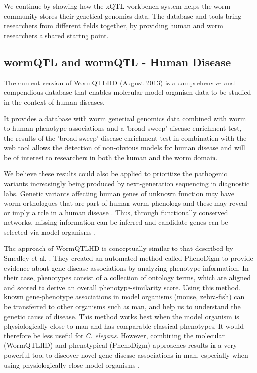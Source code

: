 We continue by showing how the xQTL workbench system helps the worm community stores their genetical 
genomics data. The database and tools bring researchers from different fields together, by providing 
human and worm researchers a shared startng point.

\subsection{wormQTL and wormQTL - Human Disease}
The current version of WormQTLHD (August 2013) is a comprehensive and compendious database that 
enables molecular model organism data to be studied in the context of human diseases. 

It provides a database with worm genetical genomics data combined with worm to human phenotype associations 
and a 'broad-sweep' disease-enrichment test, the results of the 'broad-sweep' disease-enrichment test in 
combination with the web tool allows the detection of non-obvious models for human disease and will be of 
interest to researchers in both the human and the worm domain. 

We believe these results could also be applied to prioritize the pathogenic variants increasingly being 
produced by next-generation sequencing in diagnostic labs. Genetic variants affecting human genes of 
unknown function may have worm orthologues that are part of human-worm phenologs and these may reveal or 
imply a role in a human disease \cite{Ostlund:2014}. Thus, through functionally conserved networks, missing 
information can be inferred and candidate genes can be selected via model organisms \cite{vanDerVelde:2014}.

The approach of WormQTLHD is conceptually similar to that described by Smedley et al. 
\cite{Smedley:2013}. They created an automated method called PhenoDigm to provide evidence about 
gene-disease associations by analyzing phenotype information. In their case, phenotypes consist of 
a collection of ontology terms, which are aligned and scored to derive an overall phenotype-similarity score. Using this 
method, known gene-phenotype associations in model organisms (mouse, zebra-fish) can be transferred 
to other organisms such as man, and help us to understand the genetic cause of disease. This method 
works best when the model organism is physiologically close to man and has comparable classical 
phenotypes. It would therefore be less useful for \emph{C. elegans}. However, combining the molecular 
(WormQTLHD) and phenotypical (PhenoDigm) approaches results in a very powerful tool to discover 
novel gene-disease associations in man, especially when using physiologically close model organisms \cite{vanDerVelde:2014}.

